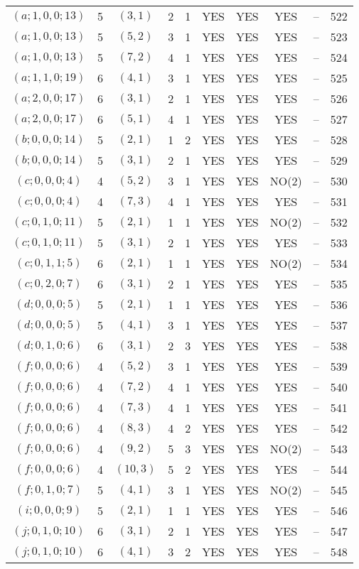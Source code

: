 \begin{longtable}{|c|c|c|c|c|c|c|c|c|c|}
$(a; 1, 0, 0; 13)$ & 5 & $(3, 1)$ & 2 & 1 & YES & YES & YES & -- & 522\\
$(a; 1, 0, 0; 13)$ & 5 & $(5, 2)$ & 3 & 1 & YES & YES & YES & -- & 523\\
$(a; 1, 0, 0; 13)$ & 5 & $(7, 2)$ & 4 & 1 & YES & YES & YES & -- & 524\\
$(a; 1, 1, 0; 19)$ & 6 & $(4, 1)$ & 3 & 1 & YES & YES & YES & -- & 525\\
$(a; 2, 0, 0; 17)$ & 6 & $(3, 1)$ & 2 & 1 & YES & YES & YES & -- & 526\\
$(a; 2, 0, 0; 17)$ & 6 & $(5, 1)$ & 4 & 1 & YES & YES & YES & -- & 527\\
$(b; 0, 0, 0; 14)$ & 5 & $(2, 1)$ & 1 & 2 & YES & YES & YES & -- & 528\\
$(b; 0, 0, 0; 14)$ & 5 & $(3, 1)$ & 2 & 1 & YES & YES & YES & -- & 529\\
$(c; 0, 0, 0; 4)$ & 4 & $(5, 2)$ & 3 & 1 & YES & YES & NO(2) & -- & 530\\
$(c; 0, 0, 0; 4)$ & 4 & $(7, 3)$ & 4 & 1 & YES & YES & YES & -- & 531\\
$(c; 0, 1, 0; 11)$ & 5 & $(2, 1)$ & 1 & 1 & YES & YES & NO(2) & -- & 532\\
$(c; 0, 1, 0; 11)$ & 5 & $(3, 1)$ & 2 & 1 & YES & YES & YES & -- & 533\\
$(c; 0, 1, 1; 5)$ & 6 & $(2, 1)$ & 1 & 1 & YES & YES & NO(2) & -- & 534\\
$(c; 0, 2, 0; 7)$ & 6 & $(3, 1)$ & 2 & 1 & YES & YES & YES & -- & 535\\
$(d; 0, 0, 0; 5)$ & 5 & $(2, 1)$ & 1 & 1 & YES & YES & YES & -- & 536\\
$(d; 0, 0, 0; 5)$ & 5 & $(4, 1)$ & 3 & 1 & YES & YES & YES & -- & 537\\
$(d; 0, 1, 0; 6)$ & 6 & $(3, 1)$ & 2 & 3 & YES & YES & YES & -- & 538\\
$(f; 0, 0, 0; 6)$ & 4 & $(5, 2)$ & 3 & 1 & YES & YES & YES & -- & 539\\
$(f; 0, 0, 0; 6)$ & 4 & $(7, 2)$ & 4 & 1 & YES & YES & YES & -- & 540\\
$(f; 0, 0, 0; 6)$ & 4 & $(7, 3)$ & 4 & 1 & YES & YES & YES & -- & 541\\
$(f; 0, 0, 0; 6)$ & 4 & $(8, 3)$ & 4 & 2 & YES & YES & YES & -- & 542\\
$(f; 0, 0, 0; 6)$ & 4 & $(9, 2)$ & 5 & 3 & YES & YES & NO(2) & -- & 543\\
$(f; 0, 0, 0; 6)$ & 4 & $(10, 3)$ & 5 & 2 & YES & YES & YES & -- & 544\\
$(f; 0, 1, 0; 7)$ & 5 & $(4, 1)$ & 3 & 1 & YES & YES & NO(2) & -- & 545\\
$(i; 0, 0, 0; 9)$ & 5 & $(2, 1)$ & 1 & 1 & YES & YES & YES & -- & 546\\
$(j; 0, 1, 0; 10)$ & 6 & $(3, 1)$ & 2 & 1 & YES & YES & YES & -- & 547\\
$(j; 0, 1, 0; 10)$ & 6 & $(4, 1)$ & 3 & 2 & YES & YES & YES & -- & 548
\end{longtable}
